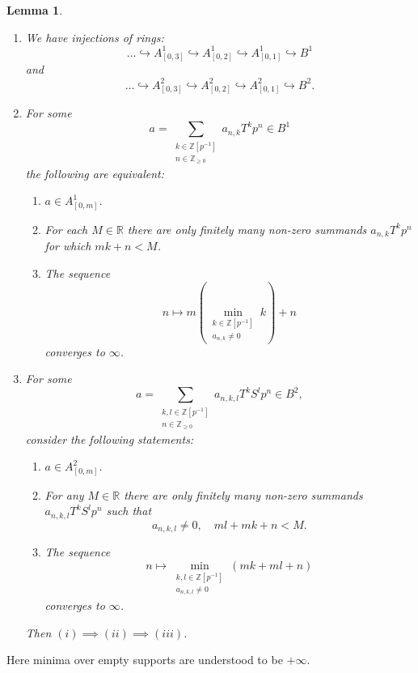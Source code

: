 \documentclass[10pt,twoside]{article}
\numberwithin{equation}{section}
\theoremstyle{plain}
\newtheorem{mylemma}[mythm]{Lemma}
\theoremstyle{definition}
\newcommand{\ZZ}{\mathbb{Z}}
\newcommand{\RR}{\mathbb{R}}
\newcommand{\ZZip}{\ZZ[p^{-1}]}
\newcommand{\ZZgez}{\ZZ_{\geq 0}}
\begin{document}
\begin{mylemma}\label{caseILemmaConvergenceCondition}
    \begin{enumerate} 
    \item We have injections of rings:
    \[ \dots \hookrightarrow A^1_{[0,3]}\hookrightarrow A^1_{[0,2]}\hookrightarrow A^1_{[0,1]}\hookrightarrow B^1\]
    and 
    \[ \dots \hookrightarrow A^2_{[0,3]}\hookrightarrow A^2_{[0,2]}\hookrightarrow A^2_{[0,1]}\hookrightarrow B^2.\]
    \item For some 
    \[a=\sum_{\substack{k\in \ZZip\\ n \in\ZZgez}} a_{n,k}T^kp^n\in B^1\]
    the following are equivalent:
    \begin{enumerate}[label=(\roman*)]
        \item \(a\in A^1_{[0,m]}\).
        \item For each \(M\in \RR\) there are only finitely many non-zero summands \(a_{n,k}T^kp^n\) for which \(mk+n<M\).
        \item The sequence 
        \[n \mapsto m(\min_{\substack{k\in \ZZip\\a_{n,k}\neq 0}} k) +n \]
        converges to \(\infty\).
    \end{enumerate}
        \item For some
        \[a=\sum_{\substack{k,l\in \ZZip\\ n \in\ZZgez}} a_{n,k,l}T^kS^lp^n\in B^2,\]
        consider the following statements:
        \begin{enumerate}[label=(\roman*)]
            \item \(a\in A^2_{[0,m]}\).
            \item For any \(M\in \RR\) there are only finitely many non-zero summands \(a_{n,k,l}T^kS^lp^n\) such that
            \[a_{n,k,l}\neq 0,\quad ml+mk+n <M.\]
            \item The sequence
            \[n \mapsto \min_{\substack{k,l\in \ZZip\\ a_{n,k,l}\neq 0}}(mk+ml+n)\]
            converges to \(\infty\).
        \end{enumerate}
        Then \((i)\implies (ii)\implies (iii)\).
    \end{enumerate}
    \end{mylemma}
    Here minima over empty supports are understood to be \(+\infty\).
\end{document}
